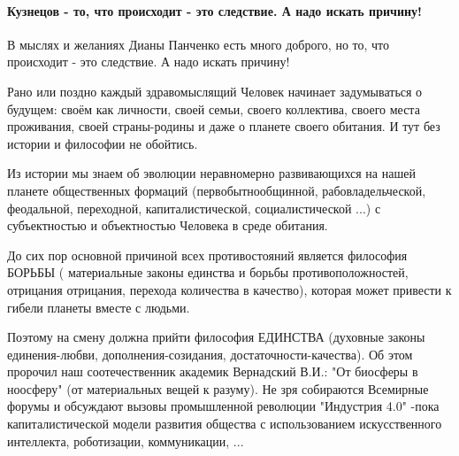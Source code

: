  
 
 
 
 
\paragraph{Кузнецов - то, что происходит - это следствие. А надо искать причину!}
\label{sec:31_07_2021.fb.panchenko_diana.1.oko_za_oko.cmt.kuznecov_prichina}

\begin{itemize}


В мыслях и желаниях Дианы Панченко есть много доброго, но то, что происходит -
это следствие. А надо искать причину! 

Рано или поздно каждый здравомыслящий Человек начинает задумываться о будущем:
своём как личности, своей семьи, своего коллектива, своего места проживания,
своей страны-родины и даже о планете своего обитания. И тут без истории и
философии не обойтись. 

Из истории мы знаем об эволюции неравномерно развивающихся на нашей планете
общественных формаций (первобытнообщинной, рабовладельческой, феодальной,
переходной, капиталистической, социалистической ...) с субъектностью и
объектностью Человека в среде обитания. 

До сих пор основной причиной всех противостояний является философия БОРЬБЫ (
материальные законы единства и борьбы противоположностей, отрицания отрицания,
перехода количества в качество), которая может привести к гибели планеты вместе
с людьми. 

Поэтому на смену должна прийти философия ЕДИНСТВА (духовные законы
единения-любви, дополнения-созидания, достаточности-качества). Об этом пророчил
наш соотечественник академик Вернадский В.И.: "От биосферы в ноосферу" (от
материальных вещей к разуму). Не зря собираются Всемирные форумы и обсуждают
вызовы промышленной революции "Индустрия 4.0" -пока капиталистической модели
развития общества с использованием искусственного интеллекта, роботизации,
коммуникации, ... 


\end{itemize}

